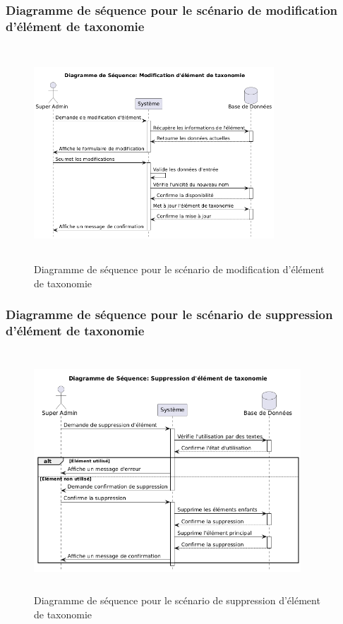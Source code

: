 \subsubsection{Diagramme de séquence pour le scénario de modification d'élément de taxonomie}
\begin{figure}[H]
    \centering
    \includegraphics[width=9cm,height=8cm]{images/modifytaxonomysq.png}
    \caption{Diagramme de séquence pour le scénario de modification d'élément de taxonomie}
\end{figure}

\subsubsection{Diagramme de séquence pour le scénario de suppression d'élément de taxonomie}
\begin{figure}[H]
    \centering
    \includegraphics[width=10cm,height=9cm]{images/deletetaxonomysq.png}
    \caption{Diagramme de séquence pour le scénario de suppression d'élément de taxonomie}
\end{figure}

